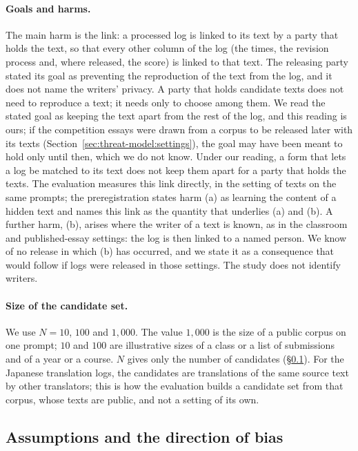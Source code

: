 \paragraph{Goals and harms.}
The main harm is the link: a processed log is linked to its text by a party that holds the text, so that every other
column of the log (the times, the revision process and, where released, the score) is linked to that text. The
releasing party stated its goal as preventing the reproduction of the text from the log, and it does not name the
writers' privacy. A party that holds candidate texts does not need to reproduce a text; it needs only to choose among
them. We read the stated goal as keeping the text apart from the rest of the log, and this reading is ours; if the
competition essays were drawn from a corpus to be released later with its texts (Section~\ref{sec:threat-model:settings}),
the goal may have been meant to hold only until then, which we do not know. Under our reading, a
form that lets a log be matched to its text does not keep them apart for a party that holds the texts. The evaluation
measures this link directly, in the setting of texts on the same prompts; the preregistration states harm (a) as learning
the content of a hidden text and names this link as the quantity that underlies (a) and (b). A further harm, (b), arises where the writer of a text is known, as in the
classroom and published-essay settings: the log is then linked to a named person. We know of no release in which (b)
has occurred, and we state it as a consequence that would follow if logs were released in those settings. The study
does not identify writers.

\paragraph{Size of the candidate set.}
We use $N = 10$, $100$ and $1{,}000$. The value $1{,}000$ is the size of a public corpus on one prompt; $10$ and
$100$ are illustrative sizes of a class or a list of submissions and of a year or a course. $N$ gives only the number
of candidates (\S\ref{sec:threat-model:bias}). For the Japanese translation logs, the
candidates are translations of the same source text by other translators; this is how the evaluation builds a
candidate set from that corpus, whose texts are public, and not a setting of its own.

\subsection{Assumptions and the direction of bias}
\label{sec:threat-model:bias}

